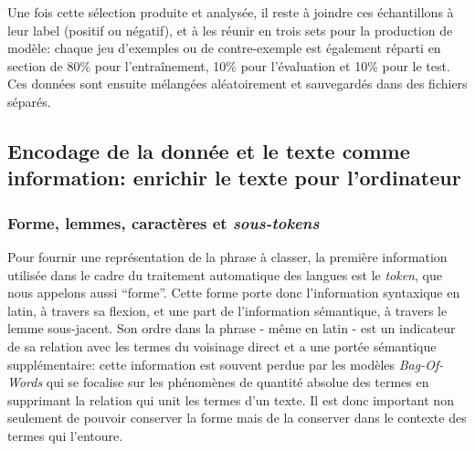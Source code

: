 Une fois cette sélection produite et analysée, il reste à joindre ces échantillons à leur label (positif ou négatif), et à les réunir en trois sets pour la production de modèle: chaque jeu d'exemples ou de contre-exemple est également réparti en section de 80\% pour l'entraînement, 10\% pour l'évaluation et 10\% pour le test. Ces données sont ensuite mélangées aléatoirement et sauvegardés dans des fichiers séparés. %

\subsection{Encodage de la donnée et le texte comme information: enrichir le texte pour l’ordinateur}


\subsubsection{Forme, lemmes, caractères et \textit{sous-tokens}}

Pour fournir une représentation de la phrase à classer, la première information utilisée dans le cadre du traitement automatique des langues est le \textit{token}, que nous appelons aussi \enquote{forme}. Cette forme porte donc l'information syntaxique en latin, à travers sa flexion, et une part de l'information sémantique, à travers le lemme sous-jacent. Son ordre dans la phrase - même en latin - %
est un indicateur de sa relation avec les termes du voisinage direct et a une portée sémantique supplémentaire: cette information est souvent perdue par les modèles \textit{Bag-Of-Words} qui se focalise sur les phénomènes de quantité absolue des termes en supprimant la relation qui unit les termes d'un texte. Il est donc important non seulement de pouvoir conserver la forme mais de la conserver dans le contexte des termes qui l'entoure. 

